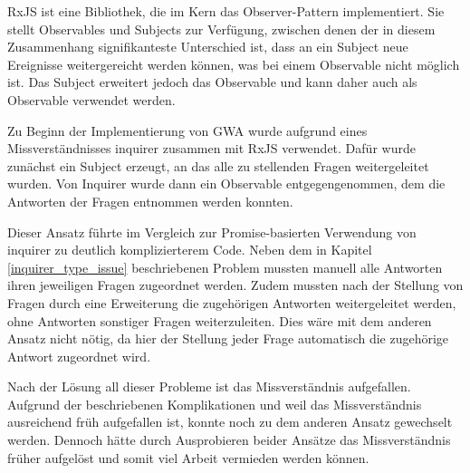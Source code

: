 RxJS ist eine Bibliothek, die im Kern das Observer-Pattern implementiert. Sie stellt Observables und Subjects zur Verfügung, zwischen denen der in diesem Zusammenhang signifikanteste Unterschied ist, dass an ein Subject neue Ereignisse weitergereicht werden können, was bei einem Observable nicht möglich ist. Das Subject erweitert jedoch das Observable und kann daher auch als Observable verwendet werden.

Zu Beginn der Implementierung von \gls{GWA} wurde aufgrund eines Missverständnisses inquirer zusammen mit RxJS verwendet. Dafür wurde zunächst ein Subject erzeugt, an das alle zu stellenden Fragen weitergeleitet wurden. Von Inquirer wurde dann ein Observable entgegengenommen, dem die Antworten der Fragen entnommen werden konnten.

Dieser Ansatz führte im Vergleich zur Promise-basierten Verwendung von inquirer zu deutlich komplizierterem Code. Neben dem in Kapitel \ref{inquirer_type_issue} beschriebenen Problem mussten manuell alle Antworten ihren jeweiligen Fragen zugeordnet werden. Zudem mussten nach der Stellung von Fragen durch eine Erweiterung die zugehörigen Antworten weitergeleitet werden, ohne Antworten sonstiger Fragen weiterzuleiten. Dies wäre mit dem anderen Ansatz nicht nötig, da hier der Stellung jeder Frage automatisch die zugehörige Antwort zugeordnet wird.

Nach der Lösung all dieser Probleme ist das Missverständnis aufgefallen. Aufgrund der beschriebenen Komplikationen und weil das Missverständnis ausreichend früh aufgefallen ist, konnte noch zu dem anderen Ansatz gewechselt werden. Dennoch hätte durch Ausprobieren beider Ansätze das Missverständnis früher aufgelöst und somit viel Arbeit vermieden werden können.
